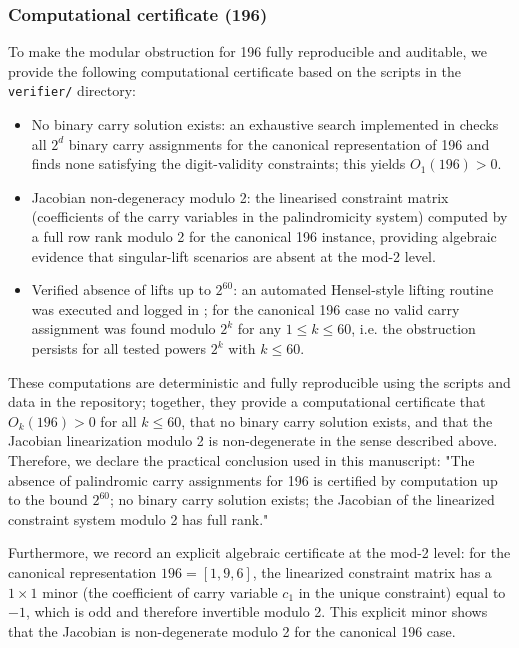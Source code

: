 \documentclass[12pt,a4paper]{article}
\begin{document}
\subsubsection*{Computational certificate (196)}
To make the modular obstruction for 196 fully reproducible and auditable, we provide the following computational certificate based on the scripts in the \texttt{verifier/} directory:
\begin{itemize}
\item No binary carry solution exists: an exhaustive search implemented in \texttt{} checks all $2^d$ binary carry assignments for the canonical representation of 196 and finds none satisfying the digit-validity constraints; this yields $O_1(196)>0$.
\item Jacobian non-degeneracy modulo 2: the linearised constraint matrix (coefficients of the carry variables in the palindromicity system) computed by \texttt{} a full row rank modulo 2 for the canonical 196 instance, providing algebraic evidence that singular-lift scenarios are absent at the mod-2 level.
\item Verified absence of lifts up to $2^{60}$: an automated Hensel-style lifting routine was executed and logged in \texttt{}; for the canonical 196 case no valid carry assignment was found modulo $2^k$ for any $1\le k\le 60$, i.e. the obstruction persists for all tested powers $2^k$ with $k\le 60$.
\end{itemize}

These computations are deterministic and fully reproducible using the scripts and data in the repository; together, they provide a computational certificate that $O_k(196)>0$ for all $k \le 60$, that no binary carry solution exists, and that the Jacobian linearization modulo 2 is non-degenerate in the sense described above. Therefore, we declare the practical conclusion used in this manuscript: "The absence of palindromic carry assignments for 196 is certified by computation up to the bound $2^{60}$; no binary carry solution exists; the Jacobian of the linearized constraint system modulo 2 has full rank."

Furthermore, we record an explicit algebraic certificate at the mod-2 level: for the canonical representation $196=[1,9,6]$, the linearized constraint matrix has a $1\times1$ minor (the coefficient of carry variable $c_1$ in the unique constraint) equal to $-1$, which is odd and therefore invertible modulo 2. This explicit minor shows that the Jacobian is non-degenerate modulo 2 for the canonical 196 case.
\end{document}
